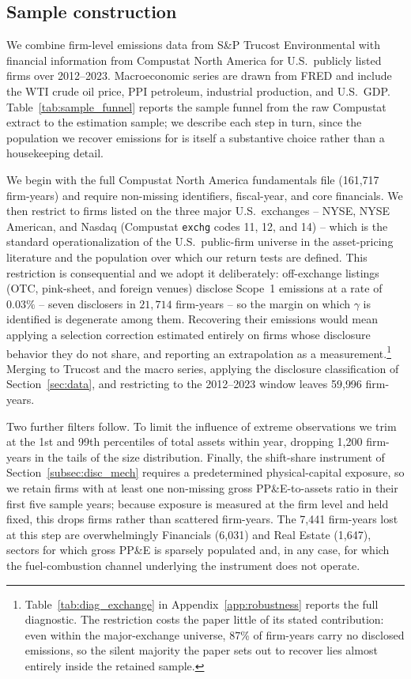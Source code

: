\documentclass[a4paper,12pt]{article}
\begin{document}
\subsection{Sample construction}

We combine firm-level emissions data from S\&P Trucost Environmental with financial information from Compustat North America for U.S.\ publicly listed firms over 2012--2023. Macroeconomic series are drawn from FRED and include the WTI crude oil price, PPI petroleum, industrial production, and U.S.\ GDP. Table~\ref{tab:sample_funnel} reports the sample funnel from the raw Compustat extract to the estimation sample; we describe each step in turn, since the population we recover emissions for is itself a substantive choice rather than a housekeeping detail.

We begin with the full Compustat North America fundamentals file (161{,}717 firm-years) and require non-missing identifiers, fiscal-year, and core financials. We then restrict to firms listed on the three major U.S.\ exchanges -- NYSE, NYSE American, and Nasdaq (Compustat \texttt{exchg} codes 11, 12, and 14) -- which is the standard operationalization of the U.S.\ public-firm universe in the asset-pricing literature and the population over which our return tests are defined. This restriction is consequential and we adopt it deliberately: off-exchange listings (OTC, pink-sheet, and foreign venues) disclose Scope~1 emissions at a rate of $0.03\%$ -- seven disclosers in $21{,}714$ firm-years -- so the margin on which $\gamma$ is identified is degenerate among them. Recovering their emissions would mean applying a selection correction estimated entirely on firms whose disclosure behavior they do not share, and reporting an extrapolation as a measurement.\footnote{Table~\ref{tab:diag_exchange} in Appendix~\ref{app:robustness} reports the full diagnostic. The restriction costs the paper little of its stated contribution: even within the major-exchange universe, 87\% of firm-years carry no disclosed emissions, so the silent majority the paper sets out to recover lies almost entirely inside the retained sample.} Merging to Trucost and the macro series, applying the disclosure classification of Section~\ref{sec:data}, and restricting to the 2012--2023 window leaves 59{,}996 firm-years.

Two further filters follow. To limit the influence of extreme observations we trim at the 1st and 99th percentiles of total assets within year, dropping 1{,}200 firm-years in the tails of the size distribution. Finally, the shift-share instrument of Section~\ref{subsec:disc_mech} requires a predetermined physical-capital exposure, so we retain firms with at least one non-missing gross PP\&E-to-assets ratio in their first five sample years; because exposure is measured at the firm level and held fixed, this drops firms rather than scattered firm-years. The 7{,}441 firm-years lost at this step are overwhelmingly Financials (6{,}031) and Real Estate (1{,}647), sectors for which gross PP\&E is sparsely populated and, in any case, for which the fuel-combustion channel underlying the instrument does not operate.
\end{document}
